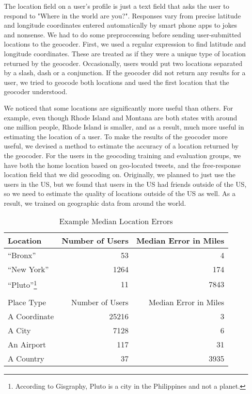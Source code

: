 \documentclass{sig-alternate}
\begin{document}
The location field on a user's profile is just a text field that asks the user to respond to "Where in the world are you?".
Responses vary from precise latitude and longitude coordinates entered automatically by smart phone apps to jokes and nonsense.
We had to do some preproccessing before sending user-submitted locations to the geocoder.
First, we used a regular expression to find latitude and longitude coordinates. These are treated as if they were a unique type of location returned by the geocoder.
Occasionally, users would put two locations separated by a slash, dash or a conjunction. If the geocoder did not return any results for a user, we tried to geocode both locations and used the first location that the geocoder understood.

We noticed that some locations are significantly more useful than others.
For example, even though Rhode Island and Montana are both states with around
one million people, Rhode Island is smaller, and as a result, much more useful
in estimating the location of a user.
To make the results of the geocoder more useful, we devised a method to estimate the accuracy of a location returned by the geocoder.
For the users in the geocoding training and evaluation groups, we have both the
home location based on geo-located tweets, and the free-response location field
that we did geocoding on.
Originally, we planned to just use the users in the US, but we found that users
in the US had friends outside of the US, so we need to estimate the quality of
locations outside of the US as well.
As a result, we trained on geographic data from around the world.

\begin{table}
\centering
\caption{Example Median Location Errors}
\begin{tabular}{l r r} 
Location&Number of Users&Median Error in Miles\\ \hline
``Bronx''&53&4\\
``New York''&1264&174\\
``Pluto''\footnote{According to Gisgraphy, Pluto is a city in the Philippines and not a planet.}&11&7843\\ \hline
\\
Place Type&Number of Users&Median Error in Miles\\ \hline
A Coordinate&25216&3\\
A City&7128&6\\
An Airport&117&31\\
A Country&37&3935\\
\hline\end{tabular}
\label{tab:MedianLocErr}
\end{table}
\end{document}
